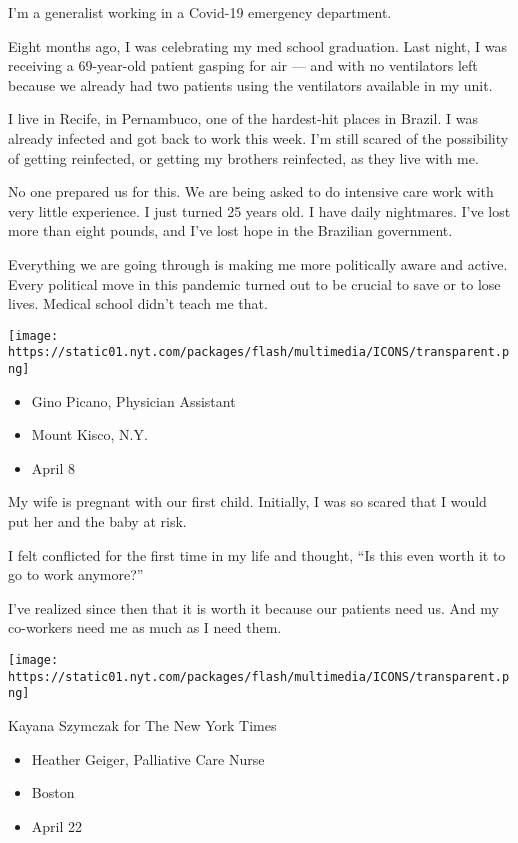 I'm a generalist working in a Covid-19 emergency department.

Eight months ago, I was celebrating my med school graduation. Last
night, I was receiving a 69-year-old patient gasping for air --- and
with no ventilators left because we already had two patients using the
ventilators available in my unit.

I live in Recife, in Pernambuco, one of the hardest-hit places in
Brazil. I was already infected and got back to work this week. I'm still
scared of the possibility of getting reinfected, or getting my brothers
reinfected, as they live with me.

No one prepared us for this. We are being asked to do intensive care
work with very little experience. I just turned 25 years old. I have
daily nightmares. I've lost more than eight pounds, and I've lost hope
in the Brazilian government.

Everything we are going through is making me more politically aware and
active. Every political move in this pandemic turned out to be crucial
to save or to lose lives. Medical school didn't teach me that.

\texttt{[image: https://static01.nyt.com/packages/flash/multimedia/ICONS/transparent.png]}

\begin{itemize}
\tightlist
\item
  Gino Picano, Physician Assistant
\item
  Mount Kisco, N.Y.
\item
  April 8
\end{itemize}

My wife is pregnant with our first child. Initially, I was so scared
that I would put her and the baby at risk.

I felt conflicted for the first time in my life and thought, ``Is this
even worth it to go to work anymore?''

I've realized since then that it is worth it because our patients need
us. And my co-workers need me as much as I need them.

\texttt{[image: https://static01.nyt.com/packages/flash/multimedia/ICONS/transparent.png]}

Kayana Szymczak for The New York Times

\begin{itemize}
\tightlist
\item
  Heather Geiger, Palliative Care Nurse
\item
  Boston
\item
  April 22
\end{itemize}

